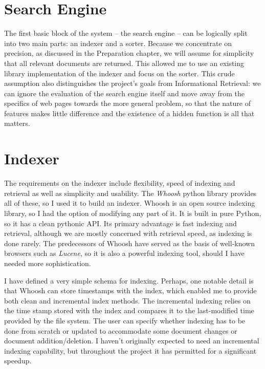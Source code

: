 \documentclass[12pt,notitlepage,twoside]{scrreprt}
\begin{document}
\section{Search Engine}

The first basic block of the system -- the search engine -- can be logically
split into two main parts: an indexer and a sorter. Because we concentrate on
precision, as discussed in the Preparation chapter, we will assume for
simplicity that all relevant documents are returned. This allowed me to use an 
existing library implementation of the indexer and focus on the sorter.
This crude assumption also distinguishes the project's goals from Informational
Retrieval: we can ignore the evaluation of the search engine itself and move
away from the specifics of web pages towards the more general problem, so that
the nature of features makes little difference and the existence of a hidden
function is all that matters.

\section{Indexer}

The requirements on the indexer include flexibility, speed of indexing and
retrieval as well as simplicity and usability.  The \textit{Whoosh} python
library provides all of these, so I used it to build an indexer. Whoosh is an
open source indexing library, so I had the option of modifying any part of it.
It is  built in pure Python, so it has a clean pythonic API. Its primary
advantage is fast indexing and retrieval, although we are mostly concerned with
retrieval speed, as indexing is done rarely. The predecessors of Whoosh have
served as the basis of well-known browsers such as \textit{Lucene}, so it is
also a powerful indexing tool, should I have needed more sophistication.

I have defined a very simple schema for indexing. Perhaps, one notable detail
is that Whoosh can store timestamps with the index, which enabled me to provide
both clean and incremental index methods. The incremental indexing relies on
the time stamp stored with the index and compares it to the last-modified time
provided by the file system. The user can specify whether indexing has to be
done from scratch or updated to accommodate some document changes or document
addition/deletion. I haven't originally expected to need an incremental
indexing capability, but throughout the project it has permitted for a
significant speedup.
\end{document}
